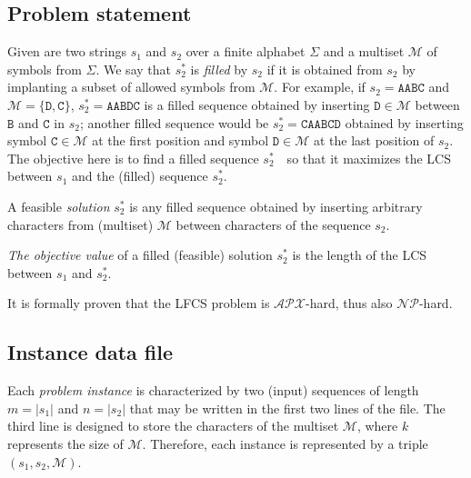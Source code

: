 \documentclass[]{article}
\begin{document}

\subsection{Problem statement}

Given are two strings $s_1$ and $s_2$ over a finite alphabet $\Sigma$ and a multiset $\mathcal{M}$ of symbols from $\Sigma$. We say that $s_2^*$ is \textit{filled} by $s_2$ if it is obtained from $s_2$ by implanting a subset of allowed symbols from $\mathcal{M}$. For example, if $s_2=\texttt{AABC}$ and $\mathcal{M}=\{\texttt{D}, \texttt{C}\}$, $s_2^*= \texttt{AABDC}$ is a filled sequence obtained by inserting $\texttt{D}\in \mathcal{M}$ between $\texttt{B}$ and $\texttt{C}$ in $s_2$; another filled sequence would be $s_2^*=\texttt{CAABCD}$ obtained by inserting symbol $\texttt{C} \in \mathcal{M}$ at the first position and symbol $\texttt{D} \in \mathcal{M}$ at the last position of $s_2$. \\
The objective here is to find a filled sequence $s_2^*$\ \ so that it maximizes the LCS between $s_1$ and the (filled) sequence $s_2^*$. 

A feasible \textit{solution} $s_2^*$ is any filled sequence obtained by inserting arbitrary characters from (multiset) $\mathcal{M}$ between characters of the sequence $s_2$. 

\textit{The objective value} of a filled (feasible) solution $s_2^*$ is the length of the LCS  between $s_1$ and $s_2^*$. 

It is formally proven that the LFCS problem is $\mathcal{APX}$-hard, thus also $\mathcal{NP}$-hard. 


\subsection{Instance data file}


Each \textit{problem instance} is characterized by two (input) sequences of length $m=|s_1|$ and $n=|s_2|$ that may be written in the first two lines of the file.  The third line is designed to store the characters of the multiset $\mathcal{M}$, where $k$ represents the size of $\mathcal{M}$. Therefore, each instance is represented by a triple $(s_1, s_2, \mathcal{M})$. 
\end{document}
